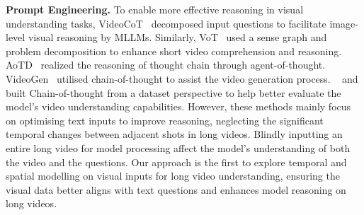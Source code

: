 \noindent\textbf{Prompt Engineering.} To enable more effective
reasoning in visual understanding tasks,
VideoCoT~\cite{wang2024videocot} decomposed input questions to
facilitate image-level visual reasoning by MLLMs. Similarly,
VoT~\cite{fei2024video1} used a sense graph and problem decomposition
to enhance short video comprehension and reasoning.  
%
AoTD~\cite{shi2024unlocking} realized the reasoning of thought chain through agent-of-thought.
%
VideoGen~\cite{zheng2024videogen} utilised chain-of-thought to assist the video generation process.
%
~\citet{himakunthala2023let} and \citet{han2024videoespresso} built Chain-of-thought from a dataset perspective to help better evaluate the model's video understanding capabilities.
%
However, these methods mainly focus on optimising text inputs to
improve reasoning, neglecting the significant temporal changes between
adjacent shots in long videos. Blindly inputting an entire long video
for model processing affect the model’s understanding of both the video and the
questions. Our approach is the first to explore temporal and spatial
modelling on visual inputs for long video understanding, ensuring the visual data better aligns
with text questions and enhances model reasoning on long videos.